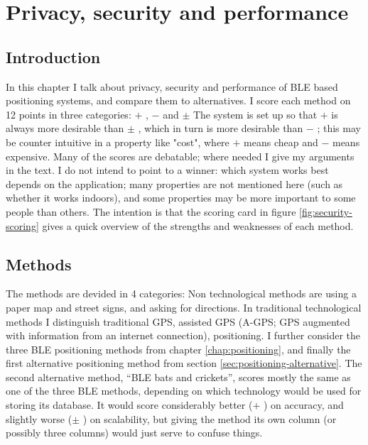 \chapter{Privacy, security and performance}
\label{chap:security}


\newcommand{\yes}{\(+\) }
\newcommand{\no}{\(-\) }
\newcommand{\maybe}{\(\pm\) }
\newcommand{\cat}[1]{\begin{em}#1\end{em}}

\section{Introduction}
In this chapter I talk about privacy, security and performance of BLE based positioning systems, and compare them to alternatives.
I score each method on 12 points in three categories: \yes, \no and \maybe
The system is set up so that \yes is always more desirable than \maybe, which in turn is more desirable than \no; this may be counter intuitive in a property like "cost", where \yes means cheap and \no means expensive.
Many of the scores are debatable; where needed I give my arguments in the text.
I do not intend to point to a winner: which system works best depends on the application; many properties are not mentioned here (such as whether it works indoors), and some properties may be more important to some people than others.
The intention is that the scoring card in figure \ref{fig:security-scoring} gives a quick overview of the strengths and weaknesses of each method.

\section{Methods}
The methods are devided in 4 categories: Non technological methods are using a paper map and street signs, and asking for directions.
In traditional technological methods I distinguish traditional GPS, assisted GPS (A-GPS; GPS augmented with information from an internet connection), \wifi positioning.
I further consider the three BLE positioning methods from chapter \ref{chap:positioning}, and finally the first alternative positioning method from section \ref{sec:positioning-alternative}.
The second alternative method, ``BLE bats and crickets'', scores mostly the same as one of the three BLE methods, depending on which technology would be used for storing its database.
It would score considerably better (\yes) on accuracy, and slightly worse (\maybe) on scalability, but giving the method its own column (or possibly three columns) would just serve to confuse things.

